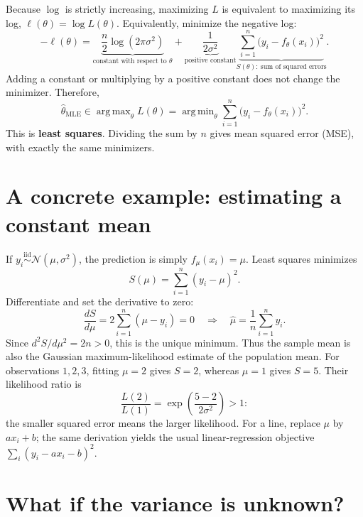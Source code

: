 \documentclass[11pt,a4paper]{article}
\DeclareMathOperator*{\argmin}{arg\,min}
\DeclareMathOperator*{\argmax}{arg\,max}
\begin{document}
Because $\log$ is strictly increasing, maximizing $L$ is equivalent to maximizing
its log, $\ell(\theta)=\log L(\theta)$. Equivalently, minimize the negative log:
\begin{equation}
    -\ell(\theta)
    =\underbrace{\frac{n}{2}\log(2\pi\sigma^2)}_{\text{constant with respect to }\theta}
     +\underbrace{\frac{1}{2\sigma^2}}_{\text{positive constant}}
      \underbrace{\sum_{i=1}^{n}\bigl(y_i-f_\theta(x_i)\bigr)^2}_{\displaystyle S(\theta):\ \text{sum of squared errors}}.
\end{equation}
Adding a constant or multiplying by a positive constant does not change the
minimizer. Therefore,
\begin{equation}
    \boxed{\widehat\theta_{\mathrm{MLE}}
    \in\argmax_\theta L(\theta)
    =\argmin_\theta\sum_{i=1}^{n}\bigl(y_i-f_\theta(x_i)\bigr)^2.}
\end{equation}
This is \textbf{least squares}. Dividing the sum by $n$ gives mean squared error
(MSE), with exactly the same minimizers.

\newpage
\section{A concrete example: estimating a constant mean}

If $y_i\overset{\mathrm{iid}}{\sim}\mathcal{N}(\mu,\sigma^2)$, the prediction is simply
$f_\mu(x_i)=\mu$. Least squares minimizes
\[
    S(\mu)=\sum_{i=1}^{n}(y_i-\mu)^2.
\]
Differentiate and set the derivative to zero:
\[
    \frac{dS}{d\mu}=2\sum_{i=1}^{n}(\mu-y_i)=0
    \quad\Longrightarrow\quad
    \boxed{\widehat\mu=\frac{1}{n}\sum_{i=1}^{n}y_i.}
\]
Since $d^2S/d\mu^2=2n>0$, this is the unique minimum. Thus the sample mean is
also the Gaussian maximum-likelihood estimate of the population mean.
For observations $1,2,3$, fitting $\mu=2$ gives $S=2$, whereas $\mu=1$ gives $S=5$.
Their likelihood ratio is
\[
    \frac{L(2)}{L(1)}
    =\exp\!\left(\frac{5-2}{2\sigma^2}\right)>1:
\]
the smaller squared error means the larger likelihood.
For a line, replace $\mu$ by $a x_i+b$; the same derivation yields the usual
linear-regression objective $\sum_i(y_i-a x_i-b)^2$.

\section{What if the variance is unknown?}
\end{document}
